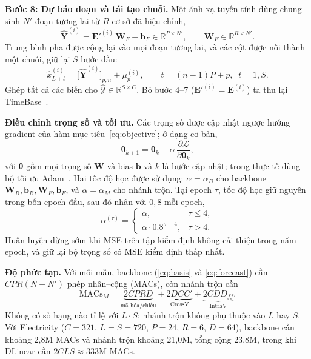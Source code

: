 \documentclass[conference]{IEEEtran}
\newcommand{\R}{\mathbb{R}}
\begin{document}
\textbf{Bước 8: Dự báo đoạn và tái tạo chuỗi.} Một ánh xạ tuyến tính dùng chung sinh $N'$ đoạn tương lai từ $R$ cơ sở đã
hiệu chỉnh,
\begin{equation}
\hat{\mathbf{Y}}^{(i)}=\mathbf{E}'^{(i)}\,\mathbf{W}_F+\mathbf{b}_F\in\R^{P\times N'},\qquad
\mathbf{W}_F\in\R^{R\times N'}.
\label{eq:forecast}
\end{equation}
Trung bình pha được cộng lại vào mọi đoạn tương lai, và các cột được nối thành một chuỗi, giữ lại $S$ bước đầu:
\begin{equation}
\hat{x}^{(i)}_{L+t}=\big[\hat{\mathbf{Y}}^{(i)}\big]_{p,n}+\mu^{(i)}_p,\qquad t=(n-1)P+p,\;\; t=\overline{1,S}.
\label{eq:merge}
\end{equation}
Ghép tất cả các biến cho $\hat{\mathcal{Y}}\in\R^{S\times C}$. Bỏ bước 4--7 ($\mathbf{E}'^{(i)}=\mathbf{E}^{(i)}$) ta thu
lại TimeBase~\cite{Huang2025TimeBase}.

\textbf{Điều chỉnh trọng số và tối ưu.} Các trọng số được cập nhật ngược hướng gradient của hàm mục
tiêu~\eqref{eq:objective}; ở dạng cơ bản,
\begin{equation}
\bm{\theta}_{k+1}=\bm{\theta}_k-\alpha\,\frac{\partial\mathcal{L}}{\partial\bm{\theta}_k},
\label{eq:gd}
\end{equation}
với $\bm{\theta}$ gồm mọi trọng số $\mathbf{W}$ và bias $\mathbf{b}$ và $k$ là bước cập nhật; trong thực tế dùng bộ tối ưu Adam~\cite{Kingma2014Adam}. Hai tốc độ học được sử dụng: $\alpha=\alpha_B$ cho backbone
$\mathbf{W}_B,\mathbf{b}_B,\mathbf{W}_F,\mathbf{b}_F$, và $\alpha=\alpha_M$ cho nhánh trộn. Tại epoch $\tau$, tốc độ học giữ
nguyên trong bốn epoch đầu, sau đó nhân với $0{,}8$ mỗi epoch,
\begin{equation}
\alpha^{(\tau)}=\begin{cases}\alpha, & \tau\le4,\\ \alpha\cdot0.8^{\,\tau-4}, & \tau>4.\end{cases}
\label{eq:lr}
\end{equation}
Huấn luyện dừng sớm khi MSE trên tập kiểm định không cải thiện trong năm epoch, và giữ lại bộ trọng số có MSE kiểm định
thấp nhất.

\textbf{Độ phức tạp.} Với mỗi mẫu, backbone (\eqref{eq:basis} và \eqref{eq:forecast}) cần $CPR(N+N')$ phép
nhân--cộng (MACs), còn nhánh trộn cần
\begin{equation}
\text{MACs}_M=\underbrace{2CPRD}_{\text{mã hóa/chiếu}}+\underbrace{2DCC'}_{\text{CrossV}}
+\underbrace{2CDD_{ff}}_{\text{IntraV}} .
\label{eq:macs}
\end{equation}
Không có số hạng nào tỉ lệ với $L\cdot S$; nhánh trộn không phụ thuộc vào $L$ hay $S$. Với Electricity ($C=321$,
$L=S=720$, $P=24$, $R=6$, $D=64$), backbone cần khoảng 2,8M MACs và nhánh trộn khoảng 21,0M, tổng cộng 23,8M, trong khi
DLinear cần $2CLS\approx333$M MACs.
\end{document}
